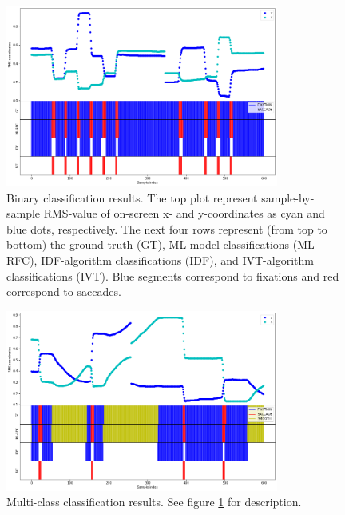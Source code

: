 \begin{figure}[h]
    \centering
    \includegraphics[width=0.8\textwidth]{Images/Classification/BinaryClassification.png}
    \caption{Binary classification results. The top plot represent sample-by-sample RMS-value of on-screen x- and y-coordinates as cyan and blue dots, respectively. The next four rows represent (from top to bottom) the ground truth (GT), ML-model classifications (ML-RFC), IDF-algorithm classifications (IDF), and IVT-algorithm classifications (IVT). Blue segments correspond to fixations and red correspond to saccades.}
    \label{fig:res_BinaryClassification}
\end{figure}

\begin{figure}[h]
    \centering
    \includegraphics[width=0.8\textwidth]{Images/Classification/MultiClassification.png}
    \caption{Multi-class classification results. See figure \ref{fig:res_BinaryClassification} for description. }
    \label{fig:res_MultiClassification}
\end{figure}
